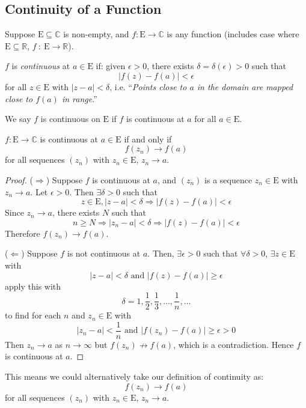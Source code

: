 \documentclass[10pt, a4paper, twoside]{report}
\begin{document}
\subsection{Continuity of a Function}
Suppose \(\mathrm{E}\subseteq\mathbb{C}\) is non-empty, and \(f:\mathrm{E}\to\mathbb{C}\) is any function (includes case where \(\mathrm{E}\subseteq\mathbb{R}\), \(f\::\:\mathrm{E}\to\mathbb{R}\)).
\begin{definition}
    \(f\) is \emph{continuous} at \(a\in\mathrm{E}\) if: given \(\epsilon>0\), there exists \(\delta=\delta(\epsilon)>0\) such that
    \[|f(z)-f(a)|<\epsilon\]
    for all \(z\in\mathrm{E}\) with \(|z-a|<\delta\), i.e. ``\emph{Points close to \(a\) in the domain are mapped close to \(f(a)\) in range}.''
    \label{def:contd}
\end{definition}
We say \(f\) is continuous on \(\mathrm{E}\) if \(f\) is continuous at \(a\) for all \(a\in\mathrm{E}\). 
\begin{theorem}
    \(f:\mathrm{E}\to\mathbb{C}\) is continuous at \(a\in\mathrm{E}\) if and only if
    \[f(z_n)\to f(a)\]
    for all sequences \((z_n)\) with \(z_n\in\mathrm{E}\), \(z_n\to a\).
    \label{thm:contd}
\end{theorem}
\begin{proof}
    (\(\Rightarrow\)) Suppose \(f\) is continuous at \(a\), and \((z_n)\) is a sequence \(z_n\in\mathrm{E}\) with \(z_n\to a\). Let \(\epsilon>0\). Then \(\exists\delta>0\) such that
    \[z\in\mathrm{E},|z-a|<\delta\Rightarrow|f(z)-f(a)|<\epsilon\]
    Since \(z_n\to a\), there exists \(N\) such that 
    \[n\geq N\Rightarrow|z_n-a|<\delta\Rightarrow|f(z)-f(a)|<\epsilon\]
    Therefore \(f(z_n)\to f(a)\).

    (\(\Leftarrow\)) Suppose \(f\) is not continuous at \(a\). Then,
    \(\exists\epsilon>0\) such that \(\forall\delta>0\), \(\exists z\in\mathrm{E}\) with
    \[|z-a|<\delta\text{  and  }|f(z)-f(a)|\geq\epsilon\]
    apply this with 
    \[\delta=1,\frac 12,\frac 13,\ldots,\frac 1n,\ldots\]
    to find for each \(n\) and \(z_n\in\mathrm{E}\) with
    \[|z_n-a|<\frac 1n\text{  and  }|f(z_n)-f(a)|\geq\epsilon>0\]
    Then \(z_n\to a\) as \(n\to\infty\) but \(f(z_n)\nrightarrow f(a)\), which is a contradiction. Hence \(f\) is continuous at \(a\).
\end{proof}
This means we could alternatively take our definition of continuity as:
\[f(z_n)\to f(a)\]
for all sequences \((z_n)\) with \(z_n\in\mathrm{E}\), \(z_n\to a\).
\end{document}
